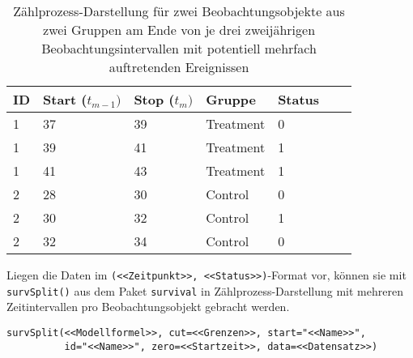 \begin{table}[ht]
\centering
\caption{Zählprozess-Darstellung für zwei Beobachtungsobjekte aus zwei Gruppen am Ende von je drei zweijährigen Beobachtungsintervallen mit potentiell mehrfach auftretenden Ereignissen}
\label{tab:survRecur}
\begin{tabular}{lllllll}
\hline
ID & \sffamily Start ($t_{m-1})$ & \sffamily Stop ($t_{m})$ & \sffamily Gruppe & \sffamily Status\\\hline\hline
 1 & 37      & 39        & Treatment        & 0 \\
 1 & 39      & 41        & Treatment        & 1 \\
 1 & 41      & 43        & Treatment        & 1 \\
 2 & 28      & 30        & Control          & 0 \\
 2 & 30      & 32        & Control          & 1 \\
 2 & 32      & 34        & Control          & 0 \\\hline
\end{tabular}
\end{table}

Liegen die Daten im \lstinline!(<<Zeitpunkt>>, <<Status>>)!-Format vor, können sie mit \lstinline!survSplit()! aus dem Paket \lstinline!survival! in Zählprozess-Darstellung mit mehreren Zeitintervallen pro Beobachtungsobjekt gebracht werden.
\begin{lstlisting}
survSplit(<<Modellformel>>, cut=<<Grenzen>>, start="<<Name>>",
          id="<<Name>>", zero=<<Startzeit>>, data=<<Datensatz>>)
\end{lstlisting}

